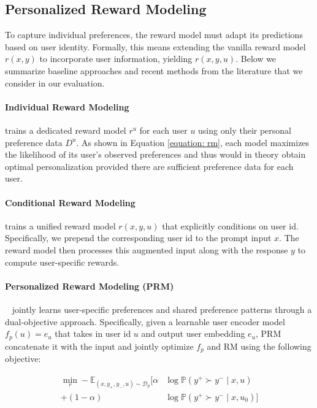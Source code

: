 \subsection{Personalized Reward Modeling}
To capture individual preferences, the reward model must adapt its predictions based on user identity. Formally, this means extending the vanilla reward model $r(x,y)$ to incorporate user information, yielding $r(x,y,u)$. Below we summarize baseline approaches and recent methods from the literature that we consider in our evaluation.

\paragraph{Individual Reward Modeling} trains a dedicated reward model $r^u$ for each user $u$ using only their personal preference data $D^u$. As shown in Equation \ref{equation: rm}, each model maximizes the likelihood of its user's observed preferences and thus would in theory obtain optimal personalization provided there are sufficient preference data for each user.

\paragraph{Conditional Reward Modeling} trains a unified reward model $r(x,y,u)$ that explicitly conditions on user id. Specifically, we prepend the corresponding user id to the prompt input $x$. The reward model then processes this augmented input along with the response $y$ to compute user-specific rewards.

\paragraph{Personalized Reward Modeling (PRM)} ~\cite{li_personalized_2024} jointly learns user-specific preferences and shared preference patterns through a dual-objective approach. Specifically, given a learnable user encoder model $f_p(u)=e_u$ that takes in user id $u$ and output user embedding $e_u$, PRM concatenate it with the input and jointly optimize $f_p$ and RM using the following objective:
\vspace{-0.4cm}

\begin{equation*}
\begin{aligned}
\min_{r} -\mathbb{E}_{(x, y_+, y_-, u) \sim \mathcal{D}_p} \Big[
 \alpha & \log \mathbb{P}(y^+ \succ y^- \mid x, u) \\
+ (1- \alpha) & \log \mathbb{P}(y^+ \succ y^- \mid x, u_0)
\Big]
\end{aligned}
\end{equation*}


